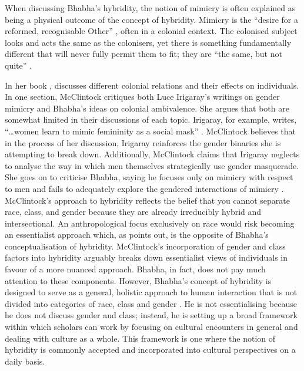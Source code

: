	When discussing Bhabha’s hybridity, the notion of mimicry is often explained as being a physical outcome of the concept of hybridity. Mimicry is the “desire for a reformed, recognisable Other” \parencite[122] {Bhabha_1994} , often in a colonial context. The colonised subject looks and acts the same as the colonisers, yet there is something fundamentally different that will never fully permit them to fit; they are “the same, but not quite”  \parencite[122] {Bhabha_1994}. 

	In her book , \citeauthor{McClintock_1995} discusses different colonial relations and their effects on individuals. In one section, McClintock critiques both Luce Irigaray’s writings on gender mimicry and Bhabha’s ideas on colonial ambivalence. She argues that both are somewhat limited in their discussions of each topic. Irigaray, for example, writes, “…women learn to mimic femininity as a social mask” \parencite [62] {McClintock_1995}. McClintock believes that in the process of her discussion, Irigaray reinforces the gender binaries she is attempting to break down. Additionally, McClintock claims that Irigaray neglects to analyse the way in which men themselves strategically use gender masquerade.   	She goes on to criticise Bhabha, saying he focuses only on mimicry with respect to men and fails to adequately explore the gendered interactions of mimicry \parencite [62] {McClintock_1995}. McClintock’s approach to hybridity reflects the belief that you cannot separate race, class, and gender because they are already irreducibly hybrid and intersectional. An anthropological focus exclusively on race would risk becoming an essentialist approach which, as \textcite [62] {McClintock_1995} points out, is the opposite of Bhabha’s conceptualisation of hybridity. 
	McClintock’s incorporation of gender and class factors into hybridity arguably breaks down essentialist views of individuals in favour of a more nuanced approach. Bhabha, in fact, does not pay much attention to these components. However, Bhabha’s concept of hybridity is designed to serve as a general, holistic approach to human interaction that is not divided into categories of race, class and gender \parencite{Bhabha_1994}. He is not essentialising because he does not discuss gender and class; instead, he is setting up a broad framework within which scholars can work by focusing on cultural encounters in general and dealing with culture as a whole. This framework is one where the notion of hybridity is commonly accepted and incorporated into cultural perspectives on a daily basis. 
	

